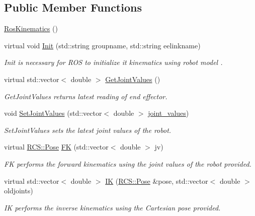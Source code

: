 \subsection*{Public Member Functions}
\begin{DoxyCompactItemize}
\item 
\hyperlink{classRosKinematics_a9dc704b4556f6db399ad18cea7d6259b}{Ros\-Kinematics} ()
\item 
virtual void \hyperlink{classRosKinematics_a307da5d4456621c4cc2dce412be30db3}{Init} (std\-::string groupname, std\-::string eelinkname)
\begin{DoxyCompactList}\small\item\em Init is necessary for R\-O\-S to initialize it kinematics using robot model . \end{DoxyCompactList}\item 
virtual std\-::vector$<$ double $>$ \hyperlink{classRosKinematics_ab3e293c7f5d7220fa7ee91256321ec92}{Get\-Joint\-Values} ()
\begin{DoxyCompactList}\small\item\em Get\-Joint\-Values returns latest reading of end effector. \end{DoxyCompactList}\item 
void \hyperlink{classRosKinematics_af9af8957f54e5d2343b2ab00dcb55525}{Set\-Joint\-Values} (std\-::vector$<$ double $>$ \hyperlink{classRosKinematics_af95c3ba0edaccafeb68022895b9824ac}{joint\-\_\-values})
\begin{DoxyCompactList}\small\item\em Set\-Joint\-Values sets the latest joint values of the robot. \end{DoxyCompactList}\item 
virtual \hyperlink{namespaceRCS_aa07e45d8a50e30064283d2b38087f999}{R\-C\-S\-::\-Pose} \hyperlink{classRosKinematics_a1b0ea6900e6da0aa888d4f4c2a23b445}{F\-K} (std\-::vector$<$ double $>$ jv)
\begin{DoxyCompactList}\small\item\em F\-K performs the forward kinematics using the joint values of the robot provided. \end{DoxyCompactList}\item 
virtual std\-::vector$<$ double $>$ \hyperlink{classRosKinematics_ae8f76a870595ca94d3876bbe51c7b142}{I\-K} (\hyperlink{namespaceRCS_aa07e45d8a50e30064283d2b38087f999}{R\-C\-S\-::\-Pose} \&pose, std\-::vector$<$ double $>$ oldjoints)
\begin{DoxyCompactList}\small\item\em I\-K performs the inverse kinematics using the Cartesian pose provided. \end{DoxyCompactList}\item 

\end{DoxyCompactItemize}
